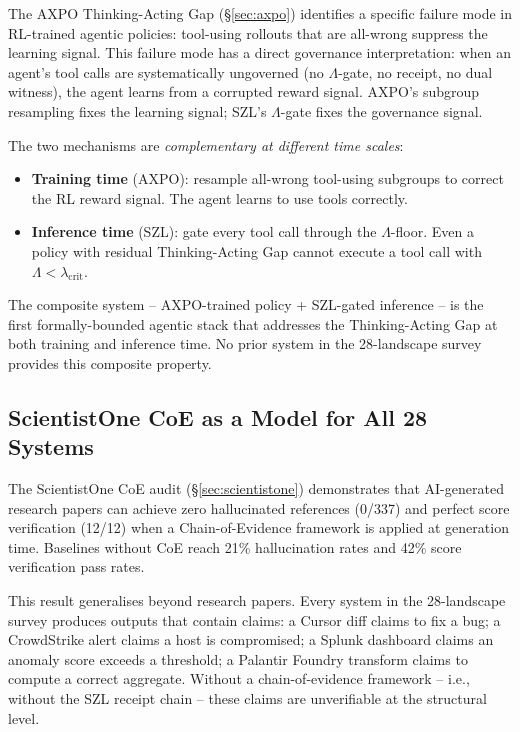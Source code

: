 The AXPO Thinking-Acting Gap (\S\ref{sec:axpo}) identifies a specific failure
mode in RL-trained agentic policies: tool-using rollouts that are all-wrong
suppress the learning signal.  This failure mode has a direct governance
interpretation: when an agent's tool calls are systematically ungoverned
(no $\Lambda$-gate, no receipt, no dual witness), the agent learns from a
corrupted reward signal.  AXPO's subgroup resampling fixes the learning
signal; SZL's $\Lambda$-gate fixes the governance signal.

The two mechanisms are \emph{complementary at different time scales}:

\begin{itemize}
  \item \textbf{Training time} (AXPO): resample all-wrong tool-using subgroups
    to correct the RL reward signal.  The agent learns to use tools correctly.
  \item \textbf{Inference time} (SZL): gate every tool call through the
    $\Lambda$-floor.  Even a policy with residual Thinking-Acting Gap cannot
    execute a tool call with $\Lambda < \lambda_{\mathrm{crit}}$.
\end{itemize}

The composite system -- AXPO-trained policy + SZL-gated inference -- is the
first formally-bounded agentic stack that addresses the Thinking-Acting Gap
at both training and inference time.  No prior system in the 28-landscape
survey provides this composite property.

\subsection{ScientistOne CoE as a Model for All 28 Systems}
\label{ssec:coe-model}

The ScientistOne CoE audit (\S\ref{sec:scientistone}) demonstrates that
AI-generated research papers can achieve zero hallucinated references (0/337)
and perfect score verification (12/12) when a Chain-of-Evidence framework
is applied at generation time.  Baselines without CoE reach 21\%
hallucination rates and 42\% score verification pass rates.

This result generalises beyond research papers.  Every system in the
28-landscape survey produces outputs that contain claims: a Cursor diff
claims to fix a bug; a CrowdStrike alert claims a host is compromised; a
Splunk dashboard claims an anomaly score exceeds a threshold; a Palantir
Foundry transform claims to compute a correct aggregate.  Without a
chain-of-evidence framework -- i.e., without the SZL receipt chain -- these
claims are unverifiable at the structural level.

